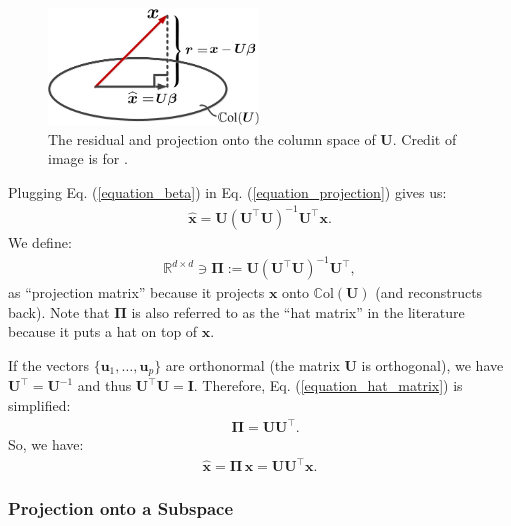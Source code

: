 \documentclass[lang=cn,10pt]{gorgeousnbook}
\numberwithin{equation}{section}%
\numberwithin{figure}{section}%
\begin{document}
\begin{figure}[!t]
\centering
\includegraphics[width=2.2in]{./images/residual_and_space}
\caption{The residual and projection onto the column space of $\boldsymbol{U}$. Credit of image is for \cite{ghojogh2019unsupervised}.}
\label{figure_residual_and_space}
\end{figure}

Plugging Eq. (\ref{equation_beta}) in Eq. (\ref{equation_projection}) gives us:
\begin{align*}
\widehat{\boldsymbol{x}} = \boldsymbol{U} (\boldsymbol{U}^\top \boldsymbol{U})^{-1} \boldsymbol{U}^\top \boldsymbol{x}.
\end{align*}
We define:
\begin{align}\label{equation_hat_matrix}
\mathbb{R}^{d \times d} \ni \boldsymbol{\Pi} := \boldsymbol{U} (\boldsymbol{U}^\top \boldsymbol{U})^{-1} \boldsymbol{U}^\top,
\end{align}
as ``projection matrix'' because it projects $\boldsymbol{x}$ onto $\mathbb{C}\text{ol}(\boldsymbol{U})$ (and reconstructs back).
Note that $\boldsymbol{\Pi}$ is also referred to as the ``hat matrix'' in the literature because it puts a hat on top of $\boldsymbol{x}$.

If the vectors $\{\boldsymbol{u}_1, \dots, \boldsymbol{u}_p\}$ are orthonormal (the matrix $\boldsymbol{U}$ is orthogonal), we have $\boldsymbol{U}^\top = \boldsymbol{U}^{-1}$ and thus $\boldsymbol{U}^\top \boldsymbol{U} = \boldsymbol{I}$. Therefore, Eq. (\ref{equation_hat_matrix}) is simplified:
\begin{align}
& \boldsymbol{\Pi} = \boldsymbol{U} \boldsymbol{U}^\top.
\end{align}
So, we have:
\begin{align}\label{equation_x_hat}
\widehat{\boldsymbol{x}} = \boldsymbol{\Pi}\, \boldsymbol{x} = \boldsymbol{U} \boldsymbol{U}^\top \boldsymbol{x}.
\end{align}

\subsubsection{Projection onto a Subspace}\label{section_projection_subspace}
\end{document}
